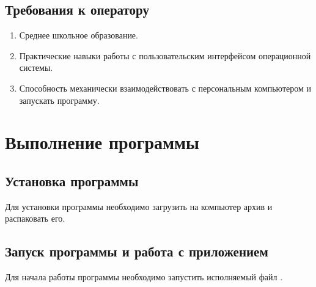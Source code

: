 \documentclass[a4paper,12pt]{article}
\begin{document}
  \subsection{Требования к оператору} %
  \begin{enumerate}
    \item Среднее школьное образование.
    \item Практические навыки работы с пользовательским интерфейсом операционной системы.
    \item Способность механически взаимодействовать с персональным компьютером и запускать программу.
  \end{enumerate}


  \newpage
  \section{Выполнение программы}
  \subsection{Установка программы}
  Для установки программы необходимо загрузить на компьютер архив \CRTzip{} и распаковать его.

  \subsection{Запуск программы и работа с приложением}
  Для начала работы программы необходимо запустить исполняемый файл \CRTexe{}.
\end{document}
